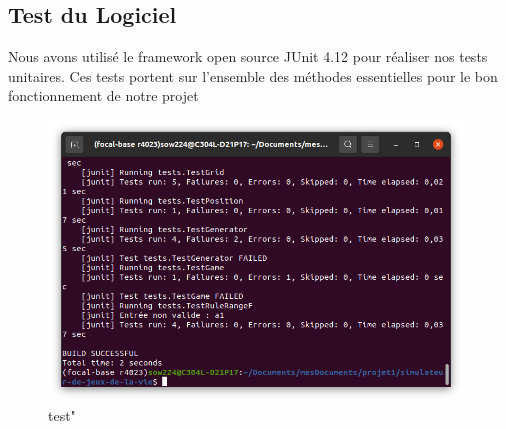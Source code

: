 \subsection{Test du Logiciel}
Nous avons utilisé le framework open source JUnit 4.12 pour réaliser nos tests unitaires. Ces tests portent sur l'ensemble des méthodes essentielles pour le bon fonctionnement de notre projet
\newpage
\begin{figure}[h]
\centering
\includegraphics[width=11cm]{images/Capture d’écran de 2023-04-20 21-15-04.png}
\caption{test"}
\end{figure}